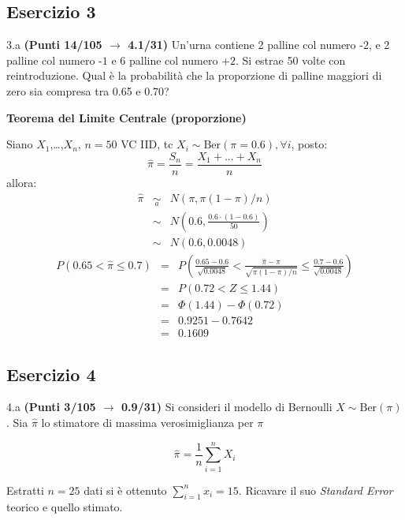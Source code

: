 \documentclass[
  11pt,
]{book}
\theoremstyle{mytheoremstyle}
\theoremstyle{mydefstyle}
\newenvironment{sol}
  {
  \begin{tcolorbox}[enhanced,breakable,arc=0.1mm,boxrule=1pt,colback=white,colframe=iblue,
  title=\bf \fontfamily{lmss}\selectfont \hspace{.5 cm} Soluzione,drop fuzzy shadow]

}{
\end{tcolorbox}
  }
\begin{document}
\subsection{Esercizio 3}\label{esercizio-3-40}

3.a \textbf{(Punti 14/105 \(\rightarrow\) 4.1/31)} Un'urna contiene 2 palline col numero \(\mbox{-2}\), e 2 palline col numero \(\mbox{-1}\) e 6 palline col numero \(\mbox{+2}\).
Si estrae 50 volte con reintroduzione.
Qual è la probabilità che la proporzione di palline maggiori di zero sia compresa tra 0.65 e 0.70?

\begin{sol}
\textbf{Teorema del Limite Centrale (proporzione)}

Siano \(X_1\),\ldots,\(X_n\), \(n=50\) VC IID, tc \(X_i\sim\text{Ber}(\pi=0.6)\)\(,\forall i\), posto:
\[
      \hat\pi=\frac{S_n}n = \frac{X_1 + ... + X_n}n
      \]
allora:\begin{eqnarray*}
  \hat\pi & \mathop{\sim}\limits_{a}& N(\pi,\pi(1-\pi)/n) \\
  &\sim & N\left(0.6,\frac{0.6\cdot(1-0.6)}{50}\right) \\
     &\sim & N(0.6,0.0048) 
  \end{eqnarray*}\begin{eqnarray*}
   P( 0.65 < \hat\pi \leq  0.7 ) &=& P\left( \frac { 0.65  -  0.6 }{\sqrt{ 0.0048 }} < \frac { \hat\pi  -  \pi }{ \sqrt{\pi(1-\pi)/n} } \leq \frac { 0.7  -  0.6 }{\sqrt{ 0.0048 }}\right)  \\
              &=& P\left(  0.72  < Z \leq  1.44 \right) \\
              &=& \Phi( 1.44 )-\Phi( 0.72 )\\
              &=&  0.9251 - 0.7642 \\ 
              &=&  0.1609 
   \end{eqnarray*}

\end{sol}

\subsection{Esercizio 4}\label{esercizio-4-40}

4.a \textbf{(Punti 3/105 \(\rightarrow\) 0.9/31)} Si consideri il modello di Bernoulli \(X\sim\text{Ber}(\pi)\). Sia \(\hat\pi\) lo stimatore di massima verosimiglianza per \(\pi\)

\[
  \hat\pi = \frac 1n \sum_{i=1}^n X_i
\]

Estratti \(n=25\) dati si è ottenuto \(\sum_{i=1}^n x_i = 15\). Ricavare il suo \emph{Standard Error} teorico e quello stimato.
\end{document}
